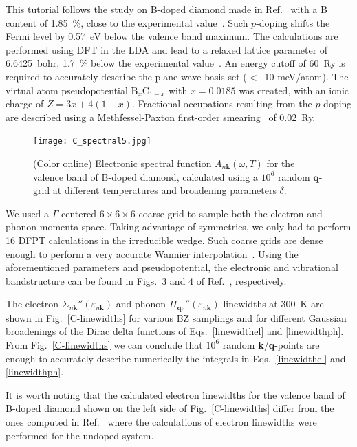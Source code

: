 \documentclass[final,3p,times,twocolumn]{elsarticle}
\begin{document}
This tutorial follows the study on B-doped diamond made in Ref.~\cite{Giustino2007} with a B content of 1.85~\%, close to the experimental value~\cite{Ekimov2004}. Such $p$-doping shifts the Fermi level by 0.57~eV below the valence band maximum. 
The calculations are performed using DFT in the LDA and lead to a relaxed lattice parameter of 6.6425~bohr, 1.7~\% below the experimental value~\cite{Ekimov2004}. An energy cutoff of 60~Ry is required to accurately describe the plane-wave basis set ($<$~10 meV/atom). The virtual atom pseudopotential $\text{B}_{x}\text{C}_{1-x}$ with $x=0.0185$ was created, with an ionic charge of $Z=3x+4(1-x)$. 
Fractional occupations resulting from the $p$-doping are described using a Methfessel-Paxton first-order smearing~\cite{Methfessel1989} of 0.02~Ry.
\begin{figure}[t!]
  \centering
  \texttt{[image: C\_spectral5.jpg]}
  \caption{\label{spectralfig}(Color online) Electronic spectral function $A_{n\mathbf{k}}(\omega, T )$ for the valence band of B-doped diamond, calculated using a $10^6$ random $\mathbf{q}$-grid at different temperatures and broadening parameters $\delta$.}
\end{figure}

We used a $\Gamma$-centered $6\times6\times6$ coarse grid to sample both the electron and phonon-momenta space. Taking advantage of symmetries, we only had to perform 16 DFPT calculations in the irreducible wedge. Such coarse grids are dense enough to perform a very accurate Wannier interpolation~\cite{Giustino2007}.
Using the aforementioned parameters and pseudopotential, the electronic and vibrational bandstructure can be found in Figs.~3 and 4 of Ref.~\cite{Giustino2007}, respectively.  

The electron $\Sigma_{n\mathbf{k}}''(\varepsilon_{n\mathbf{k}})$ and phonon $\Pi_{\mathbf{q}\nu}''(\varepsilon_{n\mathbf{k}})$ linewidths at 300~K  are shown in Fig.~\ref{C-linewidths} for various BZ samplings and for different Gaussian broadenings of the Dirac delta functions of Eqs.~\eqref{linewidthel} and \eqref{linewidthph}. From Fig.~\ref{C-linewidths} we can conclude that $10^6$ random \textbf{k}/\textbf{q}-points are enough to accurately  describe numerically the integrals in Eqs.~\eqref{linewidthel} and \eqref{linewidthph}.
   
It is worth noting that the calculated electron linewidths for the valence band of B-doped diamond shown on the left side of Fig.~\ref{C-linewidths} differ from the ones computed in Ref.~\cite{Giustino2007} where the calculations of electron linewidths were performed for the undoped system.
\end{document}
